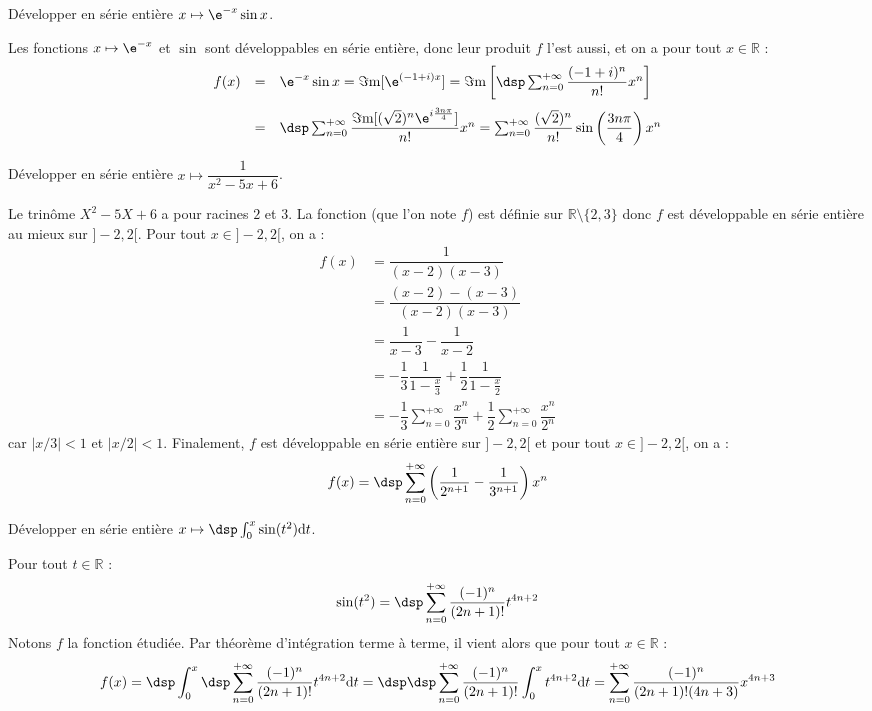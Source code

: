 \documentclass[a4paper,10pt]{report}
\begin{document}
\begin{Exercice}{} Développer en série entière $x \mapsto \e^{-x}\sin x$.
\end{Exercice}

\corr Les fonctions $x\mapsto\e^{-x}$ et $\sin$ sont développables en série entière, donc leur produit $f$ l'est aussi, et on a pour tout $x\in\mathbb{R}$ : 
\[
\begin{array}{rcl}
f(x) &= & \e^{-x}\sin x=\Im\mathrm{m}[\e^{(-1+i)x}]=\Im\mathrm{m}\left[\dsp\sum_{n=0}^{+\infty}\dfrac{(-1+i)^n}{n!}x^n\right]\\
\vspace*{-0.2cm}\\
& = & \dsp\sum_{n=0}^{+\infty}\dfrac{\Im\mathrm{m}[(\sqrt{2})^n\e^{i\frac{3n\pi}{4}}]}{n!}x^n=\sum_{n=0}^{+\infty}\dfrac{(\sqrt{2})^n}{n!}\sin\left(\dfrac{3n\pi}{4}\right)x^n
\end{array}
\]

\begin{Exercice}{} Développer en série entière $x \mapsto \dfrac{1}{x^2-5x+6}$.
\end{Exercice}

\corr Le trinôme $X^2-5X+6$ a pour racines $2$ et $3$. La fonction (que l'on note $f$) est définie sur $\mathbb{R} \setminus \lbrace 2,3 \rbrace$ donc $f$ est développable en série entière au mieux sur $]-2,2[$. Pour tout $x \in ]-2,2[$, on a :
\begin{align*}
f(x) & = \dfrac{1}{(x-2)(x-3)}\\
&  = \dfrac{(x-2)-(x-3)}{(x-2)(x-3)}  \\
& = \dfrac{1}{x-3} - \dfrac{1}{x-2} \\
& = -\dfrac{1}{3}\dfrac{1}{1-\frac{x}{3}}+\dfrac{1}{2}\dfrac{1}{1-\frac{x}{2}} \\
& =-\dfrac{1}{3}\sum_{n=0}^{+\infty}\dfrac{x^n}{3^n}+\dfrac{1}{2}\sum_{n=0}^{+\infty}\dfrac{x^n}{2^n}
\end{align*} 
car $\vert x/3 \vert <1$ et $\vert x/2 \vert <1$. Finalement, $f$ est développable en série entière sur $]-2,2[$ et pour tout $x \in ]-2,2[$, on a :
$$ f(x) = \dsp\sum_{n=0}^{+\infty}\left(  \dfrac{1}{2^{n+1}}-\dfrac{1}{3^{n+1}}\right)x^n$$

\begin{Exercice}{} Développer en série entière $x \mapsto \dsp\int_0^x\sin(t^2)\mathrm{d}t$.
\end{Exercice}

\corr Pour tout $t\in\mathbb{R}$ : 
\[
\sin(t^2)=\dsp\sum_{n=0}^{+\infty}\dfrac{(-1)^n}{(2n+1)!}t^{4n+2}
\]
Notons $f$ la fonction étudiée. Par théorème d'intégration terme à terme, il vient alors que pour tout $x\in\mathbb{R}$ : 
$$f(x)=\dsp\int_0^x\dsp\sum_{n=0}^{+\infty}\dfrac{(-1)^n}{(2n+1)!}t^{4n+2}\mathrm{d}t=\dsp\dsp\sum_{n=0}^{+\infty}\dfrac{(-1)^n}{(2n+1)!}\int_0^xt^{4n+2}\mathrm{d}t=\sum_{n=0}^{+\infty}\dfrac{(-1)^n}{(2n+1)!(4n+3)}x^{4n+3}$$
\end{document}
